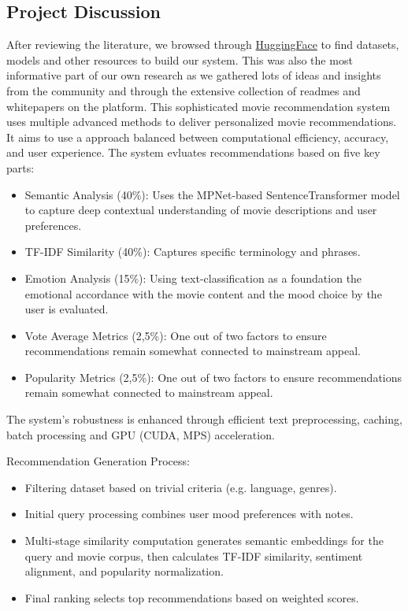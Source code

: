 \documentclass[12pt,a4paper]{article}
\begin{document}
\subsection{Project Discussion}

After reviewing the literature, we browsed through \href{https://www.huggingface.com/}{HuggingFace} to find datasets,
models and other resources to build our system.
This was also the most informative part of our own research as we gathered lots of ideas and insights from the community
and through the extensive collection of readmes and whitepapers on the platform.
This sophisticated movie recommendation system uses multiple advanced methods to deliver personalized movie recommendations.
It aims to use a approach balanced between computational efficiency, accuracy, and user experience.
The system evluates recommendations based on five key parts:
\begin{itemize}
  \item Semantic Analysis (40\%): Uses the MPNet-based SentenceTransformer model to capture deep contextual understanding of movie descriptions and user preferences.
  \item TF-IDF Similarity (40\%): Captures specific terminology and phrases.
  \item Emotion Analysis (15\%): Using text-classification as a foundation the emotional accordance with the movie content and the mood choice by the user is evaluated.
  \item Vote Average Metrics (2,5\%): One out of two factors to ensure recommendations remain somewhat connected to mainstream appeal.
  \item Popularity Metrics (2,5\%): One out of two factors to ensure recommendations remain somewhat connected to mainstream appeal.
\end{itemize}

\noindent The system’s robustness is enhanced through efficient text preprocessing, caching, batch processing and GPU (CUDA, MPS) acceleration.

\noindent Recommendation Generation Process:
\begin{itemize}
  \item Filtering dataset based on trivial criteria (e.g. language, genres).
  \item Initial query processing combines user mood preferences with notes.
  \item Multi-stage similarity computation generates semantic embeddings for the query and movie corpus, then calculates TF-IDF similarity, sentiment alignment, and popularity normalization.
  \item Final ranking selects top recommendations based on weighted scores.
\end{itemize}
\end{document}
